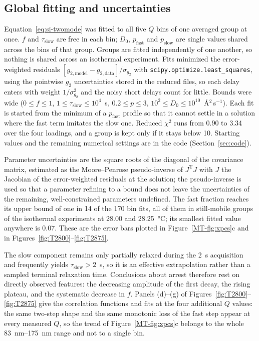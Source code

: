 \documentclass[11pt]{article}
\begin{document}
\subsection{Global fitting and uncertainties}
\label{sec:xpcsfit}
Equation~\ref{eq:si-twomode} was fitted to all five $Q$ bins of one averaged group at once. $f$ and $\tau_{\mathrm{slow}}$ are free in each bin; $D_0$, $p_{\mathrm{fast}}$ and $p_{\mathrm{slow}}$ are single values shared across the bins of that group. Groups are fitted independently of one another, so nothing is shared across an isothermal experiment. Fits minimized the error-weighted residuals $[g_{2,\mathrm{model}}-g_{2,\mathrm{data}}]/\sigma_{g_2}$ with \texttt{scipy.optimize.least\_squares}, using the pointwise $g_2$ uncertainties stored in the reduced files, so each delay enters with weight $1/\sigma_{g_2}^2$ and the noisy short delays count for little. Bounds were wide ($0\le f\le1$, $1\le\tau_{\mathrm{slow}}\le10^4$~s, $0.2\le p\le3$, $10^{2}\le D_0\le10^{10}$~\AA$^2$\,s$^{-1}$). Each fit is started from the minimum of a $p_{\mathrm{fast}}$ profile so that it cannot settle in a solution where the fast term imitates the slow one. Reduced $\chi^2$ runs from 0.90 to 3.34 over the four loadings, and a group is kept only if it stays below 10. Starting values and the remaining numerical settings are in the code (Section~\ref{sec:code}).

Parameter uncertainties are the square roots of the diagonal of the covariance matrix, estimated as the Moore--Penrose pseudo-inverse of $J^{\mathrm{T}}J$ with $J$ the Jacobian of the error-weighted residuals at the solution; the pseudo-inverse is used so that a parameter refining to a bound does not leave the uncertainties of the remaining, well-constrained parameters undefined. The fast fraction reaches its upper bound of one in 14 of the 170 bin fits, all of them in still-mobile groups of the isothermal experiments at 28.00 and \SI{28.25}{\degreeCelsius}; its smallest fitted value anywhere is 0.07. These are the error bars plotted in Figure~\ref*{MT-fig:xpcs}c and in Figures~\ref{fig:T2800}--\ref{fig:T2875}.

The slow component remains only partially relaxed during the \SI{2}{\second} acquisition and frequently yields $\tau_{\mathrm{slow}}>2$~s, so it is an effective extrapolation rather than a sampled terminal relaxation time. Conclusions about arrest therefore rest on directly observed features: the decreasing amplitude of the first decay, the rising plateau, and the systematic decrease in $f$. Panels (d)--(g) of Figures~\ref{fig:T2800}--\ref{fig:T2875} give the correlation functions and fits at the four additional $Q$ values: the same two-step shape and the same monotonic loss of the fast step appear at every measured $Q$, so the trend of Figure~\ref*{MT-fig:xpcs}c belongs to the whole \SIrange{83}{175}{\nano\meter} range and not to a single bin.
\end{document}

